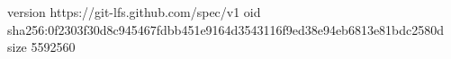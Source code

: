 version https://git-lfs.github.com/spec/v1
oid sha256:0f2303f30d8c945467fdbb451e9164d3543116f9ed38e94eb6813e81bdc2580d
size 5592560
